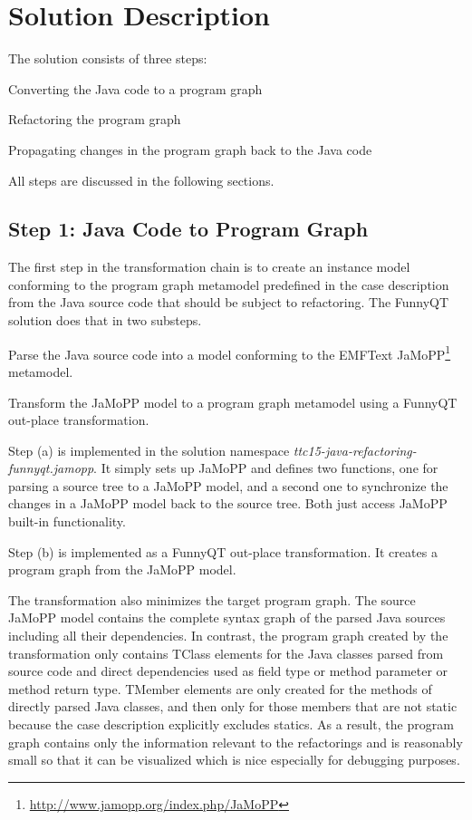 \documentclass[submission]{eptcs}
\begin{document}
\section{Solution Description}
\label{sec:solution-description}

The solution consists of three steps:
\begin{compactenum}[1.]
\item Converting the Java code to a program graph
\item Refactoring the program graph
\item Propagating changes in the program graph back to the Java code
\end{compactenum}
All steps are discussed in the following sections.

\subsection{Step 1: Java Code to Program Graph}
\label{sec:step-1:java-to-pg}

The first step in the transformation chain is to create an instance model
conforming to the program graph metamodel predefined in the case description
from the Java source code that should be subject to refactoring.  The FunnyQT
solution does that in two substeps.
\begin{compactenum}[(a)]
\item Parse the Java source code into a model conforming to the EMFText
  JaMoPP\footnote{\url{http://www.jamopp.org/index.php/JaMoPP}} metamodel.
\item Transform the JaMoPP model to a program graph metamodel using a FunnyQT
  out-place transformation.
\end{compactenum}
Step (a) is implemented in the solution namespace
\emph{ttc15-java-refactoring-funnyqt.jamopp}.  It simply sets up JaMoPP and
defines two functions, one for parsing a source tree to a JaMoPP model, and a
second one to synchronize the changes in a JaMoPP model back to the source
tree.  Both just access JaMoPP built-in functionality.

Step (b) is implemented as a FunnyQT out-place transformation.  It creates a
program graph from the JaMoPP model.

The transformation also minimizes the target program graph.  The source JaMoPP
model contains the complete syntax graph of the parsed Java sources including
all their dependencies.  In contrast, the program graph created by the
transformation only contains \textsf{TClass} elements for the Java classes
parsed from source code and direct dependencies used as field type or method
parameter or method return type.  \textsf{TMember} elements are only created
for the methods of directly parsed Java classes, and then only for those
members that are not static because the case description explicitly excludes
statics.  As a result, the program graph contains only the information relevant
to the refactorings and is reasonably small so that it can be visualized which
is nice especially for debugging purposes.
\end{document}
